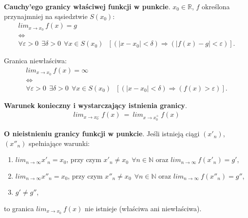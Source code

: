 \documentclass[main.tex]{subfiles}
\begin{document}
    \begin{definition}
        \textbf{Cauchy'ego granicy właściwej funkcji w punkcie}. $x_0 \in \mathbb{R}$, $f$
        określona przynajmniej na sąsiedztwie $S(x_0)$:
        \begin{gather*}
            lim_{x \rightarrow x_0} ~ f(x)  = g\\
            \Leftrightarrow\\
            \forall \varepsilon > 0 ~~ \exists \delta > 0 ~~ \forall  x \in S(x_0)  ~~~ [(|x - x_0| <  \delta) \Rightarrow (|f(x) - g| < \varepsilon)].
        \end{gather*}

        Granica niewłaściwa:
        \begin{gather*}
            lim_{x \rightarrow x_0} ~ f(x)  = \infty\\
            \Leftrightarrow\\
            \forall \varepsilon > 0 ~~ \exists \delta > 0 ~~ \forall  x \in S(x_0)  ~~~ [(|x - x_0| <  \delta) \Rightarrow (f(x) > \varepsilon)].
        \end{gather*}
    \end{definition}

    \begin{theorem}
        \textbf{Warunek konieczny i wystarczający istnienia granicy}.
        \begin{align*}
            lim_{x \rightarrow x^{-}_0}  ~ f(x) ~ = ~ lim_{x \rightarrow x^{+}_0}  ~ f(x)
        \end{align*}
    \end{theorem}


    \begin{theorem}
        \textbf{O nieistnieniu granicy funkcji w punkcie}. Jeśli istnieją ciągi $(x'_n)$, $(x''_n)$ spełniające warunki:
        \begin{enumerate}
            \item $lim_{n \rightarrow \infty} x'_n = x_0$, przy czym $x'_n \neq x_0 ~~ \forall n \in \mathbb{N}$
            oraz $lim_{n \rightarrow \infty}  ~ f(x'_n) = g'$,
            \item $lim_{n \rightarrow \infty} x''_n = x_0$, przy czym $x''_n \neq x_0 ~~ \forall n \in \mathbb{N}$
            oraz $lim_{n \rightarrow \infty}  ~ f(x''_n) = g''$,
            \item $g' \neq g''$,
        \end{enumerate}
        to granica $lim_{x \rightarrow x_0} ~ f(x)$ nie istnieje (właściwa ani niewłaściwa).
    \end{theorem}
\end{document}
